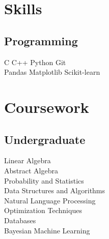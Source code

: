 \documentclass[]{deedy-resume-openfont}
\begin{document}
\begin{minipage}[t]{0.33\textwidth}

\section{Skills}
\subsection{Programming}
C \textbullet{}   C++ \textbullet{} Python  \textbullet{} Git  \\ 
 Pandas \textbullet{} Matplotlib \textbullet{} Scikit-learn
\sectionsep




\section{Coursework}

\subsection{Undergraduate}
Linear Algebra \\
Abstract Algebra \\
Probability and Statistics \\
Data Structures and Algorithms \\
Natural Language Processing \\
Optimization Techniques \\
Databases \\
Bayesian Machine Learning

\sectionsep


\end{minipage}
\end{document}
